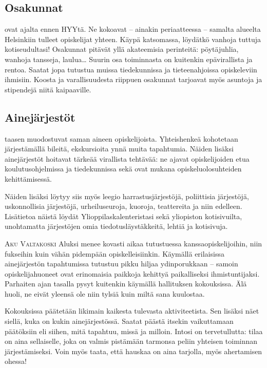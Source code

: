 \documentclass[a5paper, 8pt, twocolumn]{book} %
\numberwithin{equation}{section}
\begin{document}
\subsection*{Osakunnat}
ovat ajalta ennen
HYYtä. Ne kokoavat -- ainakin periaatteessa
-- samalta alueelta Helsinkiin tulleet
opiskelijat yhteen. Käypä katsomassa, löydätkö
vanhoja tuttuja kotiseudultasi! Osakunnat
pitävät yllä akateemisia perinteitä:
pöytäjuhlia, wanhoja tansseja, laulua\dots
Suurin osa toiminnasta on kuitenkin epävirallista
ja rentoa. Saatat jopa tutustua muissa
tiedekunnissa ja tieteenahjoissa opiskeleviin
ihmisiin. Koosta ja varallisuudesta riippuen osakunnat tarjoavat myös asuntoja
ja stipendejä niitä kaipaaville.
\subsection*{Ainejärjestöt}
taasen muodostuvat saman aineen opiskelijoista.
Yhteishenkeä kohotetaan järjestämällä
bileitä, ekskursioita ynnä muita
tapahtumia. Näiden lisäksi ainejärjestöt
hoitavat tärkeää virallista tehtävää: ne ajavat
opiskelijoiden etua koulutusohjelmissa ja tiedekunnissa
sekä ovat mukana opiskeluolosuhteiden
kehittämisessä.

Näiden lisäksi löytyy siis myös leegio
harrastusjärjestöjä, poliittisia järjestöjä, uskonnollisia
järjestöjä, urheiluseuroja, kuoroja,
teattereita ja niin edelleen. Lisätietoa
näistä löydät Ylioppilaskalenteristasi sekä
yliopiston kotisivuilta, unohtamatta järjestöjen
omia tiedotusläystäkkeitä, lehtiä ja
kotisivuja.

\vspace{0.5cm}\noindent\textsc{Aku Valtakoski}
Aluksi menee kovasti aikaa tutustuessa
kanssaopiskelijoihin, niin fukseihin kuin
vähän pidempään opiskelleisiinkin. Käymällä
erilaisissa ainejärjestön tapahtumissa
tutustuu pikku hiljaa ydinporukkaan -- samoin
opiskelijahuoneet ovat
erinomaisia paikkoja kehittyä paikalliseksi
ihmistuntijaksi. Parhaiten ajan tasalla pysyt
kuitenkin käymällä hallituksen kokouksissa.
Älä huoli, ne eivät yleensä ole niin tylsiä
kuin miltä sana kuulostaa.

Kokouksissa päätetään likimain kaikesta
tulevasta aktiviteetista. Sen lisäksi näet
siellä, kuka on kukin ainejärjestössä. Saatat
päästä itsekin vaikuttamaan päätöksiin
eli siihen, mitä tapahtuu, missä ja milloin.
Intosi on tervetullutta: tilaa on aina sellaiselle,
joka on valmis pistämään tarmonsa
peliin yhteisen toiminnan järjestämiseksi.
Voin myös taata, että hauskaa on aina tarjolla,
myös ahertamisen ohessa!
\end{document}
